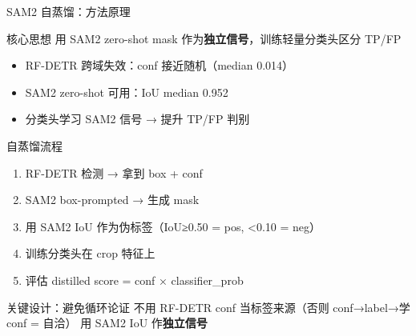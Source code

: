 \documentclass[aspectratio=169, 10pt]{beamer}
\begin{document}
\begin{frame}{SAM2 自蒸馏：方法原理}
  \begin{block}{核心思想}
    用 SAM2 zero-shot mask 作为\textbf{独立信号}，训练轻量分类头区分 TP/FP
    \begin{itemize}
      \item RF-DETR 跨域失效：conf 接近随机（median 0.014）
      \item SAM2 zero-shot 可用：IoU median 0.952
      \item 分类头学习 SAM2 信号 → 提升 TP/FP 判别
    \end{itemize}
  \end{block}
  \vspace{-0.3em}
  \begin{block}{自蒸馏流程}
    \begin{enumerate}
      \item RF-DETR 检测 → 拿到 box + conf
      \item SAM2 box-prompted → 生成 mask
      \item 用 SAM2 IoU 作为伪标签（IoU≥0.50 = pos, <0.10 = neg）
      \item 训练分类头在 crop 特征上
      \item 评估 distilled score = conf × classifier\_prob
    \end{enumerate}
  \end{block}
  \vspace{-0.3em}
  \begin{alertblock}{关键设计：避免循环论证}
    不用 RF-DETR conf 当标签来源（否则 conf→label→学 conf = 自洽）
    用 SAM2 IoU 作\textbf{独立信号}
  \end{alertblock}
\end{frame}
\end{document}
